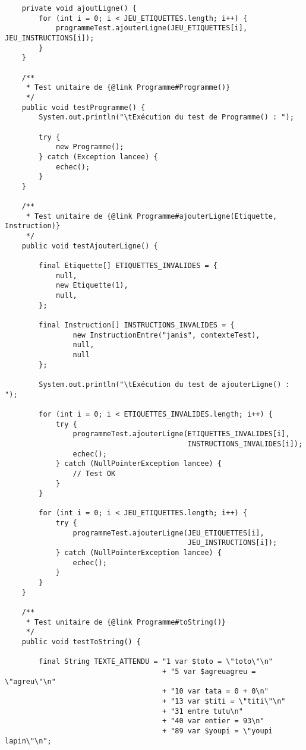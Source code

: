 \begin{enum}
\begin{verbatim}
    private void ajoutLigne() {
        for (int i = 0; i < JEU_ETIQUETTES.length; i++) {
            programmeTest.ajouterLigne(JEU_ETIQUETTES[i], JEU_INSTRUCTIONS[i]);
        }
    }

    /** 
     * Test unitaire de {@link Programme#Programme()} 
     */
    public void testProgramme() {
        System.out.println("\tExécution du test de Programme() : ");
        
        try {
            new Programme();
        } catch (Exception lancee) {
            echec();
        }
    }

    /** 
     * Test unitaire de {@link Programme#ajouterLigne(Etiquette, Instruction)} 
     */
    public void testAjouterLigne() {
        
        final Etiquette[] ETIQUETTES_INVALIDES = {
            null,
            new Etiquette(1),
            null,
        };

        final Instruction[] INSTRUCTIONS_INVALIDES = {
                new InstructionEntre("janis", contexteTest),
                null,
                null
        };
        
        System.out.println("\tExécution du test de ajouterLigne() : ");
        
        for (int i = 0; i < ETIQUETTES_INVALIDES.length; i++) {
            try {
                programmeTest.ajouterLigne(ETIQUETTES_INVALIDES[i], 
                                           INSTRUCTIONS_INVALIDES[i]);
                echec();
            } catch (NullPointerException lancee) {
                // Test OK
            }
        }
        
        for (int i = 0; i < JEU_ETIQUETTES.length; i++) {
            try {
                programmeTest.ajouterLigne(JEU_ETIQUETTES[i], 
                                           JEU_INSTRUCTIONS[i]);
            } catch (NullPointerException lancee) {
                echec();
            }
        }
    }
    
    /** 
     * Test unitaire de {@link Programme#toString()}
     */
    public void testToString() {
        
        final String TEXTE_ATTENDU = "1 var $toto = \"toto\"\n"
                                     + "5 var $agreuagreu = \"agreu\"\n"
                                     + "10 var tata = 0 + 0\n"
                                     + "13 var $titi = \"titi\"\n"
                                     + "31 entre tutu\n"
                                     + "40 var entier = 93\n"
                                     + "89 var $youpi = \"youpi lapin\"\n";
                

\end{verbatim}
\end{enum}
